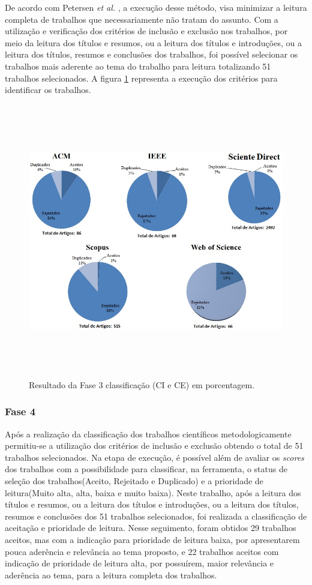 De acordo com Petersen \textit{et al.} \cite{petersen2008systematic}, a execução desse método, visa minimizar a leitura completa de trabalhos que necessariamente não tratam do assunto. Com a utilização e verificação dos critérios de inclusão e exclusão nos trabalhos, por meio da leitura dos títulos e resumos, ou a leitura dos títulos e introduções, ou a leitura dos títulos, resumos e conclusões dos trabalhos, foi possível selecionar os trabalhos mais aderente ao tema do trabalho para leitura totalizando 51 trabalhos selecionados. A figura \ref{fig:fase3Criterios} representa a execução dos critérios para identificar os trabalhos.

\begin{figure}[H]
\centering
\includegraphics[width = 16cm, height=12cm]{img/Classificacao_FASE_3_CI_e_CE.jpg}
\caption{Resultado da Fase 3 classificação (CI e CE) em porcentagem.}
\label{fig:fase3Criterios}
\end{figure}

\subsubsection{Fase 4} Após a realização da classificação dos trabalhos científicos metodologicamente permitiu-se a utilização dos critérios de inclusão e exclusão obtendo o total de 51 trabalhos selecionados. Na etapa de execução, é possível além de avaliar os \textit{scores} dos trabalhos com a possibilidade para classificar, na ferramenta, o status de seleção dos trabalhos(Aceito, Rejeitado e Duplicado) e a prioridade de leitura(Muito alta, alta, baixa e muito baixa). Neste trabalho, após a leitura dos títulos e resumos, ou a leitura dos títulos e introduções, ou a leitura dos títulos, resumos e conclusões dos 51 trabalhos selecionados, foi realizada a classificação de aceitação e prioridade de leitura. Nesse seguimento, foram obtidos 29 trabalhos aceitos, mas com a indicação para prioridade de leitura baixa, por apresentarem pouca aderência e relevância ao tema proposto, e 22 trabalhos aceitos com indicação de prioridade de leitura alta, por possuírem, maior relevância e aderência ao tema, para a leitura completa dos trabalhos.   

